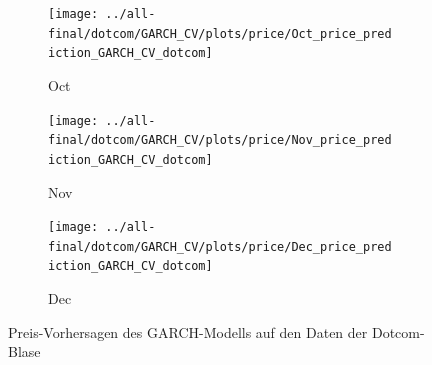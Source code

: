\documentclass[ngerman]{ttlab-qualify}
\begin{document}
\begin{figure}[H]
  \begin{subfigure}{.3\linewidth}
  \texttt{[image: ../all-final/dotcom/GARCH\_CV/plots/price/Oct\_price\_prediction\_GARCH\_CV\_dotcom]}\hfill
  \caption{Oct}
  \end{subfigure}
  \begin{subfigure}{.3\linewidth}
  \texttt{[image: ../all-final/dotcom/GARCH\_CV/plots/price/Nov\_price\_prediction\_GARCH\_CV\_dotcom]}\hfill
  \caption{Nov}
  \end{subfigure}
  \begin{subfigure}{.3\linewidth}
  \texttt{[image: ../all-final/dotcom/GARCH\_CV/plots/price/Dec\_price\_prediction\_GARCH\_CV\_dotcom]}\hfill
  \caption{Dec}
  \end{subfigure}
  \caption{Preis-Vorhersagen des GARCH-Modells auf den Daten der Dotcom-Blase}
\end{figure}
\end{document}
